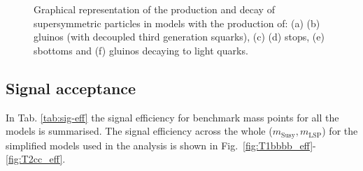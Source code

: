 \begin{figure}[h!]
\begin{center}
{            \label{fig:T2cc_feyn}
            } \\
         ~~
        \caption{Graphical representation of the production and decay of
            supersymmetric particles in models with the production of: (a) (b)
            gluinos (with decoupled third generation squarks), (c) (d) stops,
            (e) sbottoms and (f) gluinos decaying to light quarks.}
        \label{fig:simplified-models-feyn}
    \end{center}
\end{figure}

\subsection{Signal acceptance}
\label{sec:sig-accept-contam}
In Tab. \ref{tab:sig-eff} the signal efficiency for benchmark mass points for
all the models is summarised. The signal efficiency across the whole
($m_{\mathrm{Susy}},m_{\mathrm{LSP}}$) for the simplified models used in the
analysis is shown in Fig.~\ref{fig:T1bbbb_eff}-\ref{fig:T2cc_eff}.


